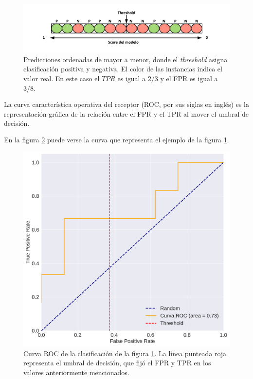 \begin{itemize}
    \begin{figure}[H]
    \centering
        \includegraphics[scale=0.6]{documents/latex/figures/1/threshold_auc.pdf}
    \caption{Predicciones ordenadas de mayor a menor, donde el \textit{threshold} asigna clasificación positiva y negativa. El color de las instancias indica el valor real. En este caso el $TPR$ es igual a 2/3 y el FPR es igual a $3/8$.}
    \label{fig:threshold_auc}
    \end{figure}
    
    La curva característica operativa del receptor (ROC, por sus siglas en inglés) es la representación gráfica de la relación entre el FPR y el TPR al mover el umbral de decisión. 

    En la figura \ref{fig:example_roc} puede verse la curva que representa el ejemplo de la figura \ref{fig:threshold_auc}.
    
    \begin{figure}[H]
        \centering
        \includegraphics[scale=0.4]{documents/latex/figures/1/roc_ejemplo.pdf}
        \caption{Curva ROC de la clasificación de la figura \ref{fig:threshold_auc}. La línea punteada roja representa el umbral de decisión, que fijó el FPR y TPR en los valores anteriormente mencionados.}
        \label{fig:example_roc}
    \end{figure}
    

\end{itemize}
